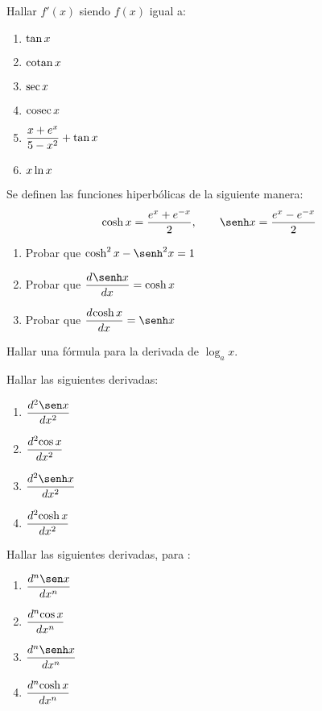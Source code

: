 \item Hallar $f'(x)$ siendo $f(x)$ igual a:
\begin{multicols}{2}
\begin{enumerate}
    \item $\D \tan x$
    \item $\D \cotan x$
    \item $\D \sec x$
    \item $\D \cosec x$
    \item $\D \frac{x+e^x}{5-x^2}+\tan x$
    \item $\D x \ln x$
\end{enumerate}
\end{multicols}

\item Se definen las funciones hiperbólicas de la siguiente manera:
\[
\cosh x = \frac{e^x+e^{-x}}{2},
\qquad
\senh x = \frac{e^x-e^{-x}}{2}
\]
\begin{enumerate}
    \item Probar que $\cosh^2 x-\senh^2 x = 1$
    \item Probar que $\D\dd{\senh x}{x} = \cosh x$
    \item Probar que $\D\dd{\cosh x}{x} = \senh x$
\end{enumerate}

\item Hallar una fórmula para la derivada de $\log_a x$.

\item Hallar las siguientes derivadas:
\begin{multicols}{2}
    \begin{enumerate}
        \item $\D\dd[2]{\sen x}{x}$
        \item $\D\dd[2]{\cos x}{x}$
        \item $\D\dd[2]{\senh x}{x}$
        \item $\D\dd[2]{\cosh x}{x}$
    \end{enumerate}
\end{multicols}


\item Hallar las siguientes derivadas, para \niN:
\begin{multicols}{2}
    \begin{enumerate}
        \item $\D\dd[n]{\sen x}{x}$
        \item $\D\dd[n]{\cos x}{x}$
        \item $\D\dd[n]{\senh x}{x}$
        \item $\D\dd[n]{\cosh x}{x}$
    \end{enumerate}
\end{multicols}